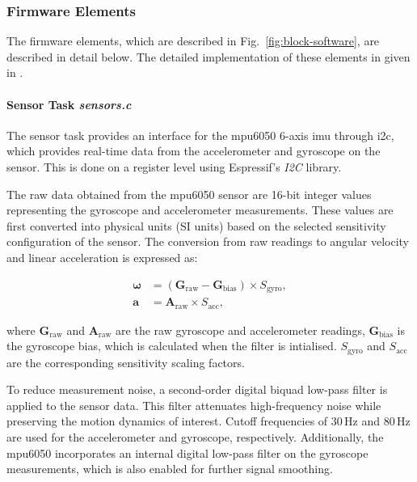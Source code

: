 \subsubsection{Firmware Elements}

The firmware elements, which are described in Fig.~\ref{fig:block-software}, are described in detail below. The detailed implementation of these elements in given in \cite{flightcontroller_git}.

\paragraph{\textbf{Sensor Task} \textit{sensors.c}} \leavevmode

The sensor task provides an interface for the \gls{mpu6050} 6-axis \gls{imu} through \gls{i2c}, which provides real-time data from the accelerometer and gyroscope on the sensor. This is done on a register level using Espressif's \textit{I2C} library.

The raw data obtained from the \gls{mpu6050} sensor are 16-bit integer values representing the gyroscope and accelerometer measurements. These values are first converted into physical units (SI units) based on the selected sensitivity configuration of the sensor. The conversion from raw readings to angular velocity and linear acceleration is expressed as:

\begin{align}
\boldsymbol{\omega} &= (\mathbf{G}_{\text{raw}} - \mathbf{G}_{\text{bias}}) \times S_{\text{gyro}}, \\[6pt]
\mathbf{a} &= \mathbf{A}_{\text{raw}} \times S_{\text{acc}},
\end{align}

where \( \mathbf{G}_{\text{raw}} \) and \( \mathbf{A}_{\text{raw}} \) are the raw gyroscope and accelerometer readings, 
\( \mathbf{G}_{\text{bias}} \) is the gyroscope bias, which is calculated when the filter is intialised. \( S_{\text{gyro}} \) and \( S_{\text{acc}} \) are the corresponding sensitivity scaling factors.

To reduce measurement noise, a second-order digital biquad low-pass filter is applied to the sensor data. This filter attenuates high-frequency noise while preserving the motion dynamics of interest. Cutoff frequencies of 30\,Hz and 80\,Hz are used for the accelerometer and gyroscope, respectively. Additionally, the \gls{mpu6050} incorporates an internal digital low-pass filter on the gyroscope measurements, which is also enabled for further signal smoothing.

